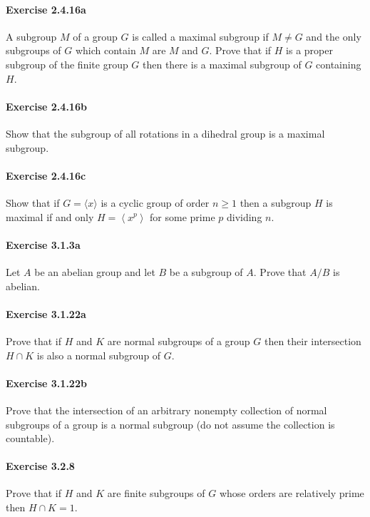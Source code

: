 \documentclass{article}
\begin{document}
\paragraph{Exercise 2.4.16a} A subgroup $M$ of a group $G$ is called a maximal subgroup if $M \neq G$ and the only subgroups of $G$ which contain $M$ are $M$ and $G$. Prove that if $H$ is a proper subgroup of the finite group $G$ then there is a maximal subgroup of $G$ containing $H$.

\paragraph{Exercise 2.4.16b} Show that the subgroup of all rotations in a dihedral group is a maximal subgroup.

\paragraph{Exercise 2.4.16c} Show that if $G=\langle x\rangle$ is a cyclic group of order $n \geq 1$ then a subgroup $H$ is maximal if and only $H=\left\langle x^{p}\right\rangle$ for some prime $p$ dividing $n$.

\paragraph{Exercise 3.1.3a} Let $A$ be an abelian group and let $B$ be a subgroup of $A$. Prove that $A / B$ is abelian.

\paragraph{Exercise 3.1.22a} Prove that if $H$ and $K$ are normal subgroups of a group $G$ then their intersection $H \cap K$ is also a normal subgroup of $G$.

\paragraph{Exercise 3.1.22b} Prove that the intersection of an arbitrary nonempty collection of normal subgroups of a group is a normal subgroup (do not assume the collection is countable).

\paragraph{Exercise 3.2.8} Prove that if $H$ and $K$ are finite subgroups of $G$ whose orders are relatively prime then $H \cap K=1$.
\end{document}
